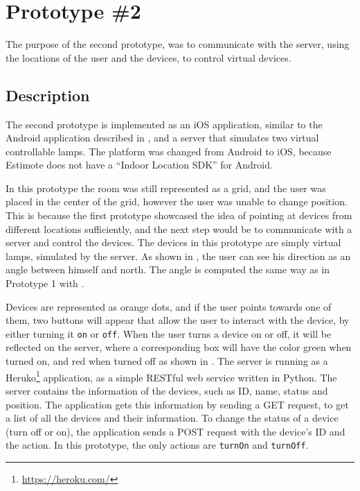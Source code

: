 \section{Prototype \#2}
\label{sec:implementation:prototypes:prototype2}
The purpose of the second prototype, 
was to communicate with the server, 
using the locations of the user and the devices, 
to control virtual devices. 

\subsection{Description}
The second prototype is implemented as an iOS application, 
similar to the Android application described in , 
and a server that simulates two virtual controllable lamps.
The platform was changed from Android to iOS, 
because Estimote does not have a ``Indoor Location SDK'' for Android.

In this prototype the room was still represented as a grid, 
and the user was placed in the center of the grid, 
however the user was unable to change position.
This is because the first prototype showcased the idea of pointing at devices from different locations sufficiently, 
and the next step would be to communicate with a server and control the devices. 
The devices in this prototype are simply virtual lamps, simulated by the server. 
As shown in , 
the user can see his direction as an angle between himself and north.
The angle is computed the same way as in Prototype 1 with .

Devices are represented as orange dots, 
and if the user points towards one of them, 
two buttons will appear that allow the user to interact with the device, 
by either turning it \texttt{on} or \texttt{off}.
When the user turns a device on or off, 
it will be reflected on the server, 
where a corresponding box will have the color green when turned on, 
and red when turned off as shown in .
The server is running as a Heruko\footnote{\url{https://heroku.com/}} application, 
as a simple RESTful web service written in Python. 
The server contains the information of the devices, 
such as ID, name, status and position.
The application gets this information by sending a GET request, 
to get a list of all the devices and their information. 
To change the status of a device (turn off or on), 
the application sends a POST request with the device's ID and the action. 
In this prototype, the only actions are \texttt{turnOn} and \texttt{turnOff}.

